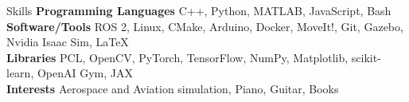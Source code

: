 \documentclass{resume}
\begin{document}
\begin{rSection}{Skills}
{\bf Programming Languages} \hspace{1em} C++, Python, MATLAB, JavaScript, Bash\\ 
{\bf Software/Tools} \hspace{1em} ROS 2, Linux, CMake, Arduino, Docker, MoveIt!, Git, Gazebo, Nvidia Isaac Sim, \LaTeX \\
{\bf Libraries } \hspace{1em} PCL, OpenCV, PyTorch, TensorFlow, NumPy, Matplotlib, scikit-learn,  OpenAI Gym, JAX \\ 
{\bf Interests } \hspace{1em}Aerospace and Aviation simulation, Piano, Guitar, Books
\end{rSection}

\newpage
\thispagestyle{reference}


\end{document}
